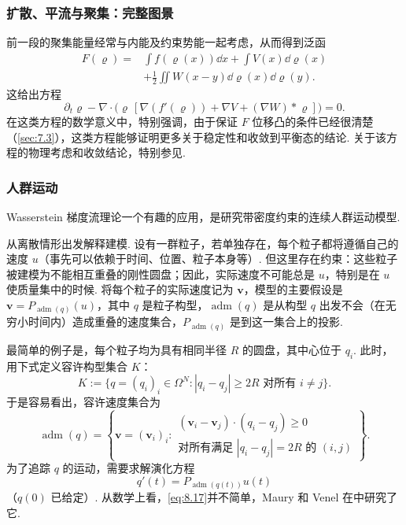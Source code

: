 \subsubsection*{扩散、平流与聚集：完整图景}
前一段的聚集能量经常与内能及约束势能一起考虑，从而得到泛函
\[
\begin{aligned}
F(\varrho)={}&\int f(\varrho(x))\dd x+\int V(x)\dd\varrho(x)\\
&+\frac12\iint W(x-y)\dd\varrho(x)\dd\varrho(y).
\end{aligned}
\]
这给出方程
\[
\partial_t\varrho-\nabla\cdot\bigl(\varrho\,[\nabla(f'(\varrho))+\nabla V+(\nabla W)*\varrho]\bigr)=0.
\]
在这类方程的数学意义中，特别强调，由于保证 $F$ 位移凸的条件已经很清楚（\autoref{sec:7.3}），这类方程能够证明更多关于稳定性和收敛到平衡态的结论. 关于该方程的物理考虑和收敛结论，特别参见\cite{b116,b117}.

\subsubsection*{人群运动}
\label{idx:i32-p308}
Wasserstein 梯度流理论一个有趣的应用，是研究带密度约束的连续人群运动模型.

从离散情形出发解释建模. 设有一群粒子，若单独存在，每个粒子都将遵循自己的速度 $u$（事先可以依赖于时间、位置、粒子本身等）. 但这里存在约束：这些粒子被建模为不能相互重叠的刚性圆盘；因此，实际速度不可能总是 $u$，特别是在 $u$ 使质量集中的时候. 将每个粒子的实际速度记为 $\mathbf v$，模型的主要假设是 $\mathbf v=P_{\operatorname{adm}(q)}(u)$，其中 $q$ 是粒子构型，$\operatorname{adm}(q)$ 是从构型 $q$ 出发不会（在无穷小时间内）造成重叠的速度集合，$P_{\operatorname{adm}(q)}$ 是到这一集合上的投影.

最简单的例子是，每个粒子均为具有相同半径 $R$ 的圆盘，其中心位于 $q_i$. 此时，用下式定义容许构型集合 $K$：
\[
K:=\{q=(q_i)_i\in\Omega^N:|q_i-q_j|\geq2R\text{ 对所有 }i\neq j\}.
\]
于是容易看出，容许速度集合为
\[
\operatorname{adm}(q)=\left\{\mathbf v=(\mathbf v_i)_i:
\begin{array}{l}
(\mathbf v_i-\mathbf v_j)\cdot(q_i-q_j)\geq0\\
\text{对所有满足 }|q_i-q_j|=2R\text{ 的 }(i,j)
\end{array}\right\}.
\]
为了追踪 $q$ 的运动，需要求解演化方程
\begin{equation}\label{eq:8.17}
q'(t)=P_{\operatorname{adm}(q(t))}u(t)
\end{equation}
（$q(0)$ 已给定）. 从数学上看，\eqref{eq:8.17}并不简单，Maury 和 Venel 在\cite{b223,b224}中研究了它.

